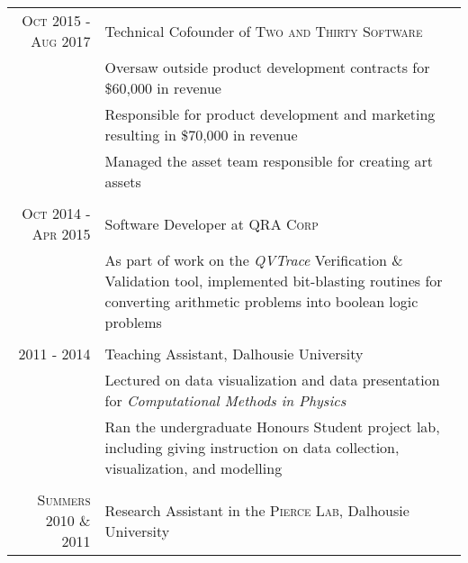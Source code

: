 \documentclass[a4paper,11pt]{article} %
\begin{document}
\begin{tabular}{r|p{11cm}}

\textsc{Oct 2015 - Aug 2017} & Technical Cofounder of \textsc{Two and Thirty Software} \\
& \footnotesize { Oversaw outside product development contracts for \$60,000 in revenue} \\
& \footnotesize { Responsible for product development and marketing resulting in   \$70,000 in revenue} \\
& \footnotesize { Managed the asset team responsible for creating art assets } \\
\multicolumn{2}{c}{} \\

\textsc{Oct 2014 - Apr 2015} & Software Developer at \textsc{QRA Corp}\\
& \footnotesize{ As part of work on the \emph{QVTrace} Verification \& Validation tool, implemented bit-blasting routines for converting arithmetic problems into boolean logic problems } \\
\multicolumn{2}{c}{} \\

\textsc{ 2011 - 2014 } & Teaching Assistant, Dalhousie University \\
& \footnotesize { Lectured on data visualization and data presentation for \emph{Computational Methods in Physics} } \\
& \footnotesize { Ran the undergraduate Honours Student project lab, including giving instruction on data collection, visualization, and modelling } \\
\multicolumn{2}{c}{} \\

\textsc{Summers 2010 \& 2011} & Research Assistant in the \textsc{Pierce Lab}, Dalhousie University  \\



\end{tabular}
\end{document}
